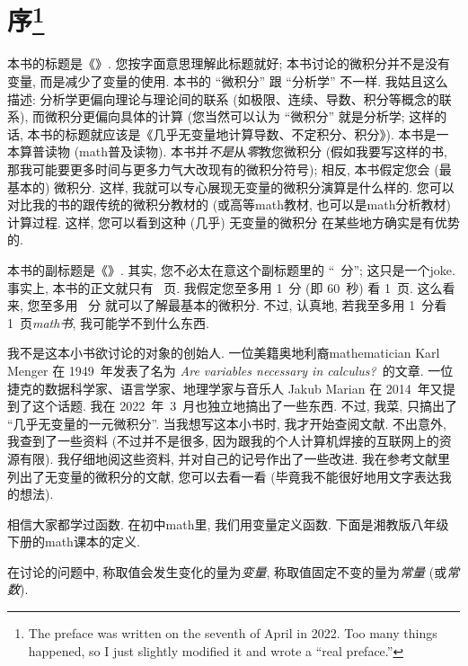 \chapter[序]{序\footnote{The preface was written
      on the seventh of April in 2022.
      Too many things happened,
      so I just slightly modified it
      and wrote a ``real preface.''}}

本书的标题是《\thetitle{}》.
您按字面意思理解此标题就好;
本书讨论的微积分并不是没有变量, 而是减少了变量的使用.
本书的 ``微积分'' 跟 ``分析学'' 不一样.
我姑且这么描述:
分析学更偏向理论与理论间的联系
(如极限、连续、导数、积分等概念的联系),
而微积分更偏向具体的计算
(您当然可以认为 ``微积分'' 就是分析学;
这样的话,
本书的标题就应该是《几乎无变量地计算导数、不定积分、积分》).
本书是一本算普读物 (\gls{math}普及读物).
本书并\emph{不是}从\emph{零}教您微积分
(假如我要写这样的书,
那我可能要更多时间与更多力气大改现有的微积分符号);
相反, 本书假定您会 (最基本的) 微积分.
这样, 我就可以专心展现无变量的微积分演算是什么样的.
您可以对比我的书的跟传统的微积分教材的
(或高等\gls{math}教材, 也可以是\gls{math}分析教材)
计算过程.
这样, 您可以看到这种 (几乎) 无变量的微积分%
在某些地方确实是有优势的.

本书的副标题是《\CalculusSubtitle{}》.
其实, 您不必太在意这个副标题里的
``\pageref{calculus:LastPage}~分'';
这只是一个\gls{joke}.
事实上, 本书的正文就只有 \pageref{calculus:LastPage}~页.
我假定您至多用 1~分 (即 60~秒) 看 1~页.
这么看来, 您至多用 \pageref{calculus:LastPage}~分%
就可以了解最基本的微积分.
不过, 认真地, 若我至多用 1~分看 1~页\emph{\gls{math}书},
我可能学不到什么东西.

我不是这本小书欲讨论的对象的创始人.
一位美籍奥地利裔\gls{mathematician} Karl Menger
在 1949~年发表了名为
\textit{Are variables necessary in calculus?}\ 的文章.
一位捷克的数据科学家、语言学家、地理学家与音乐人
Jakub Marian 在 2014~年又提到了这个话题.
我在 2022~年~3~月也独立地搞出了一些东西.
不过, 我菜, 只搞出了 ``几乎无变量的一元微积分''.
当我想写这本小书时, 我才开始查阅文献.
不出意外, 我查到了一些资料
(不过并不是很多, 因为跟我的个人计算机焊接的互联网上的资源有限).
我仔细地阅这些资料, 并对自己的记号作出了一些改进.
我在参考文献里列出了无变量的微积分的文献, 您可以去看一看
(毕竟我不能很好地用文字表达我的想法).

相信大家都学过函数.
在初中\gls{math}里, 我们用变量定义函数.
下面是湘教版八年级下册的\gls{math}课本的定义.

\begin{definition*}
    在讨论的问题中,
    称取值会发生变化的量为\emph{变量},
    称取值固定不变的量为\emph{常量} (或\emph{常数}).
\end{definition*}

